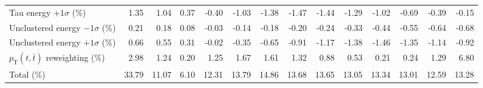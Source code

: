\begin{table}[htbp]
{\begin{tabular}{lrrrrrrrrrrrrr}
Tau energy $+1\sigma$ (\%) & 1.35 & 1.04 & 0.37 & -0.40 & -1.03 & -1.38 & -1.47 & -1.44 & -1.29 & -1.02 & -0.69 & -0.39 & -0.15 \\ 
Unclustered energy $-1\sigma$ (\%) & 0.21 & 0.18 & 0.08 & -0.03 & -0.14 & -0.18 & -0.20 & -0.24 & -0.33 & -0.44 & -0.55 & -0.64 & -0.68 \\ 
Unclustered energy $+1\sigma$ (\%) & 0.66 & 0.55 & 0.31 & -0.02 & -0.35 & -0.65 & -0.91 & -1.17 & -1.38 & -1.46 & -1.35 & -1.14 & -0.92 \\ 
$p_\mathrm{T}(t,\bar{t})$ reweighting (\%) & 2.98 & 1.24 & 0.20 & 1.25 & 1.67 & 1.61 & 1.32 & 0.88 & 0.53 & 0.21 & 0.24 & 1.29 & 6.80 \\ 
\hline 
Total (\%) & 33.79  & 11.07  & 6.10  & 12.31  & 13.79  & 14.86  & 13.68  & 13.65  & 13.05  & 13.34  & 13.01  & 12.59  & 13.28 \\ 
\hline 
\end{tabular}
}
\end{table}

